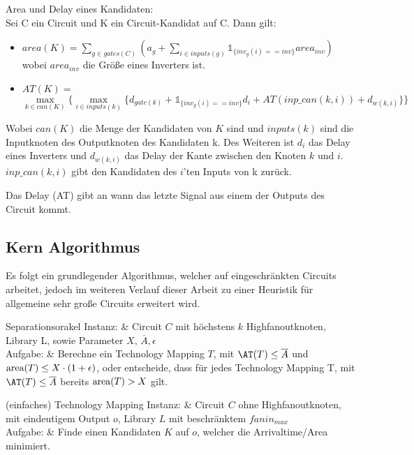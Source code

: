 \documentclass[11pt, a4paper, german]{article}
\begin{document}
\begin{definition}{Area und Delay eines Kandidaten:}\\
Sei C ein Circuit und K ein Circuit-Kandidat auf C. Dann gilt: \\
\begin{itemize}
\item $area(K) = \sum_{g \in gates(C)} (a_g + \sum_{i \in inputs(g)} \mathbb{1}_{\{inv_g(i)==inv\}} area_{inv})$ \\
wobei $area_{inv}$ die Größe eines Inverters ist.
\item $AT(K) = $\\$  \max\limits_{k \in can(K)} \{\max\limits_{i \in inputs(k)} \{   d_{gate(k)} + \mathbb{1}_{\{inv_g(i)==inv\}} d_{i} + AT(inp\_can(k,i)) + d_{w(k,i)} \} \}$ 
\end{itemize}
Wobei $can(K)$ die Menge der Kandidaten von $K$ sind und $inputs(k)$ sind die Inputknoten des Outputknoten des Kandidaten k. Des Weiteren ist $d_i$ das Delay eines Inverters und $d_{w(k,i)} $ das Delay der Kante zwischen den Knoten $k$ und $i$. $inp\_can(k,i)$ gibt den Kandidaten des $i$'ten Inputs von k zurück. 

\end{definition}

Das Delay (AT) gibt an wann das letzte Signal aus einem der Outputs des Circuit kommt.

\subsection{Kern Algorithmus}

Es folgt ein grundlegender Algorithmus, welcher auf eingeschränkten Circuits arbeitet, jedoch im weiteren Verlauf dieser Arbeit zu einer Heuristik für allgemeine sehr große Circuits erweitert wird.


\begin{problem}[framed]{Separationsorakel}
 Instanz: & Circuit $C$ mit h\"ochstens $k$ Highfanoutknoten, Library L, sowie Parameter $X$, $\overline{A}, \epsilon$\\
 Aufgabe: & Berechne ein Technology Mapping $T$, mit $\AT(T) \leq \overline{A}$ und $\text{area}(T) \leq X\cdot(1+\epsilon)$, oder entscheide, dass f\"ur jedes Technology Mapping T, mit $\AT(T) \leq \overline{A}$ bereits $\text{area}(T) > X$ gilt.
\end{problem}

\begin{problem}[framed]{(einfaches) Technology Mapping}
  Instanz:  & Circuit $C$ ohne Highfanoutknoten, mit eindeutigem Output $o$, Library $L$ mit beschr\"anktem $fanin_{max}$\\
  Aufgabe: &  Finde einen Kandidaten $K$ auf $o$, welcher die Arrivaltime/Area minimiert.
\end{problem}
\end{document}
